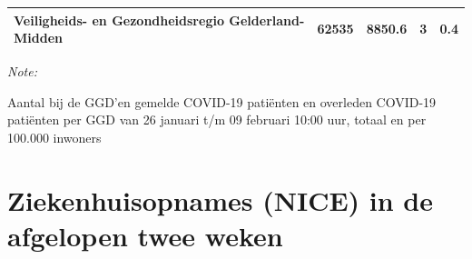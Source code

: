 \documentclass[
  english,
  man,floatsintext]{apa6}
\begin{document}
\begin{table}
\begin{threeparttable}
\begin{tabular}{lrrrr}
Veiligheids- en Gezondheidsregio Gelderland-Midden & 62535 & 8850.6 & 3 & 0.4\\
\bottomrule
\end{tabular}
\begin{tablenotes}
\item \textit{Note: } 
\item Aantal bij de GGD’en gemelde COVID-19 patiënten en overleden COVID-19 patiënten per GGD van 26 januari t/m 09 februari 10:00 uur, totaal en per 100.000 inwoners
\end{tablenotes}
\end{threeparttable}
\endgroup{}
\end{table}

\newpage

\hypertarget{ziekenhuisopnames-nice-in-de-afgelopen-twee-weken}{%
\section{Ziekenhuisopnames (NICE) in de afgelopen twee weken}\label{ziekenhuisopnames-nice-in-de-afgelopen-twee-weken}}
\end{document}
